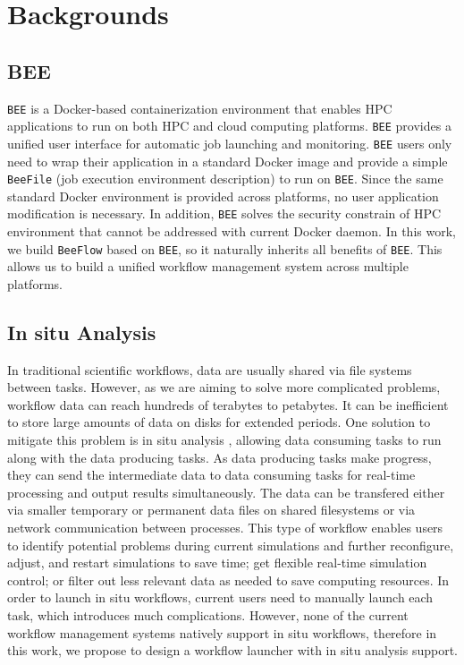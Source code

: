 \section{Backgrounds}
\subsection{BEE}
\texttt{BEE} \cite{bee} is a Docker-based containerization environment that enables HPC applications to run on both HPC and cloud computing platforms. \texttt{BEE} provides a unified user interface for automatic job launching and monitoring. \texttt{BEE} users only need to wrap their application in a standard Docker image and provide a simple \texttt{BeeFile} (job execution environment description) to run on \texttt{BEE}. Since the same standard Docker environment is provided across platforms, no user application modification is necessary. In addition, \texttt{BEE} solves the security constrain of HPC environment that cannot be addressed with current Docker daemon. In this work, we build \texttt{BeeFlow} based on \texttt{BEE}, so it naturally inherits all benefits of \texttt{BEE}. This allows us to build a unified workflow management system across multiple platforms. 
\subsection{In situ Analysis}
In traditional scientific workflows, data are usually shared via file systems between tasks. However, as we are aiming to solve more complicated problems, workflow data can reach hundreds of terabytes to petabytes. It can be inefficient to store large amounts of data on disks for extended periods. One solution to mitigate this problem is in situ analysis \cite{sewell2015large}, allowing data consuming tasks to run along with the data producing tasks. As data producing tasks make progress, they can send the intermediate data to data consuming tasks for real-time processing and output results simultaneously. The data can be transfered either via smaller temporary or permanent data files on shared filesystems or via network communication between processes. This type of workflow enables users to identify potential problems during current simulations and further reconfigure, adjust, and restart simulations to save time; get flexible real-time simulation control; or filter out less relevant data as needed to save computing resources. In order to launch in situ workflows, current users need to manually launch each task, which introduces much complications. However, none of the current workflow management systems natively support in situ workflows, therefore in this work, we propose to design a workflow launcher with in situ analysis support.
